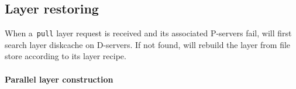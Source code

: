 


\subsection{Layer restoring}
\label{sec:restore-desgin}



When a~\texttt{pull} layer request is received and its associated 
P-servers fail, 
\sysname will first search layer diskcache on D-servers.
If not found,
\sysname will rebuild the layer from file store according to its layer recipe. 

\paragraph{Parallel layer construction}

